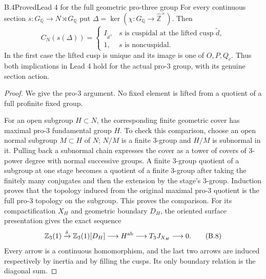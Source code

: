 \begin{statement}{B.4}{Proved}{Lead 4 for the full geometric pro-three group}
For every continuous section
$s:G_{\mathbb Q}\to N\rtimes G_{\mathbb Q}$ put
$\Delta=\ker(\chi:G_{\mathbb Q}\to\widehat{\mathbb Z}^{\times})$.
Then
\[
 C_N(s(\Delta))=
 \begin{cases}
 I_{\widetilde d},&s\text{ is cuspidal at the lifted cusp }\widetilde d,\\
 1,&s\text{ is noncuspidal}.
 \end{cases}                                                \tag{B.7}
\]
In the first case the lifted cusp is unique and its image is one
of $O,P,Q_c$.  Thus both implications in Lead 4 hold for the
actual pro-$3$ group, with its genuine section action.
\end{statement}
\begin{proof}
We give the pro-$3$ argument.  No fixed element is lifted from a
quotient of a full profinite fixed group.

For an open subgroup $H\subset N$, the corresponding finite
geometric cover has maximal pro-$3$ fundamental group $H$.
To check this comparison, choose an open normal subgroup
$M\subset H$ of $N$; $N/M$ is a finite $3$-group and $H/M$ is
subnormal in it.  Pulling back a subnormal chain expresses the
cover as a tower of covers of $3$-power degree with normal
successive groups.  A finite $3$-group quotient of a subgroup
at one stage becomes a quotient of a finite $3$-group after
taking the finitely many conjugates and then the extension by
the stage's $3$-group.  Induction proves that the topology
induced from the original maximal pro-$3$ quotient is the full
pro-$3$ topology on the subgroup.  This proves the comparison.
For its compactification $X_H$ and geometric boundary $D_H$,
the oriented surface presentation gives the exact sequence
\[
 \mathbb Z_3(1)\xrightarrow{\delta}
 \mathbb Z_3(1)[D_H]\longrightarrow H^{\rm ab}
 \longrightarrow T_3J_{X_H}\longrightarrow0.                \tag{B.8}
\]
Every arrow is a continuous homomorphism, and the last two
arrows are induced respectively by inertia and by filling the
cusps.  Its only boundary relation is the diagonal sum.


\end{proof}
